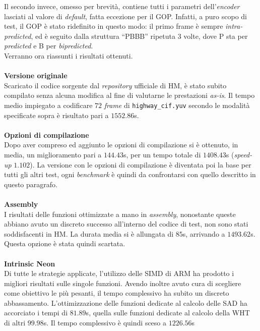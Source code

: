 Il secondo invece, omesso per brevità, contiene tutti i parametri 
dell'\emph{encoder} lasciati al valore di \emph{default}, fatta eccezione per 
il GOP. Infatti, a puro scopo di test, il GOP è stato ridefinito in questo  
modo: il primo frame è sempre \emph{intra-predicted}, ed è seguito dalla 
struttura  
``PBBB''
ripetuta 3 volte, dove P sta per \textit{predicted} e B per 
\textit{bipredicted}.\\
Verranno ora riassunti i risultati ottenuti. 
\\ \\
\textbf{Versione originale}\\
  Scaricato il codice sorgente dal \emph{repository} ufficiale di HM, è stato 
  subito compilato senza alcuna modifica al fine di valutarne le prestazioni 
  \emph{as-is}. Il tempo medio impiegato a codificare $72$ \emph{frame} di 
  \verb|highway_cif.yuv| secondo le modalità specificate sopra è risultato pari 
  a $1552.86$s.
\\ \\
\textbf{Opzioni di compilazione}\\
  Dopo aver compreso ed aggiunto le opzioni di compilazione
  si è ottenuto, in media, un miglioramento pari a $144.43$s, per un tempo 
  totale di $1408.43$s 
  (\textit{speed-up} $1.102$).
  La versione con le opzioni di compilazione è diventata poi la base per tutti 
  gli altri test, ogni \textit{benchmark} è quindi da confrontarsi con quello 
  descritto in questo paragrafo.
\\ \\
\textbf{Assembly}\\
  I risultati delle funzioni ottimizzate a mano in \emph{assembly}, nonostante 
  queste abbiano avuto un discreto successo all'interno del codice di test, non 
  sono stati soddisfacenti in HM. %
  La durata media si è allungata di $85$s, arrivando a $1493.62$s. Questa 
  opzione è stata quindi scartata.
\\ \\
\textbf{Intrinsic Neon}\\
  Di tutte le strategie applicate, l'utilizzo delle SIMD di ARM ha prodotto i 
  migliori risultati sulle singole funzioni. Avendo inoltre avuto cura di 
  scegliere come obiettivo le più pesanti, il tempo complessivo ha subito un 
  discreto abbassamento.
  L'ottimizzazione delle funzioni dedicate al calcolo delle SAD ha accorciato i 
  tempi di $81.89$s, quella sulle funzioni dedicate al calcolo della WHT di 
  altri $99.98$s. Il tempo complessivo è quindi sceso a $1226.56$s   
